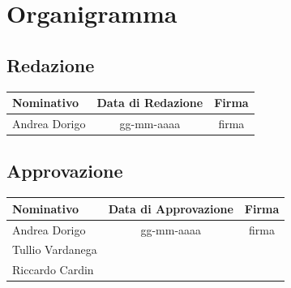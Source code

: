 \chapter{Organigramma}\label{Organigramma}

\section{Redazione}\label{7.1}
\quad
\def\tabularxcolumn#1{m{#1}}
{	
	\begin{center}
		\renewcommand{\arraystretch}{1.4}
		\begin{tabularx}{\textwidth}{|X|c|c|}
			\hline
			\rowcolor{airforceblue}
			\textbf{Nominativo} & \textbf{Data di Redazione} & \textbf{Firma}\\
			\hline
			Andrea Dorigo & gg-mm-aaaa & firma\\
			\hline
		\end{tabularx}
	\end{center}

\section{Approvazione}\label{7.2}
\quad
\def\tabularxcolumn#1{m{#1}}
{	
	\begin{center}
		\renewcommand{\arraystretch}{1.4}
		\begin{tabularx}{\textwidth}{|X|c|c|}
			\hline
			\rowcolor{airforceblue}
			\textbf{Nominativo} & \textbf{Data di Approvazione} & \textbf{Firma}\\
			\hline
			Andrea Dorigo & gg-mm-aaaa & firma\\
			\hline
			Tullio Vardanega & &\\
			Riccardo Cardin & &\\
			\hline
		\end{tabularx}
	\end{center}

}}
